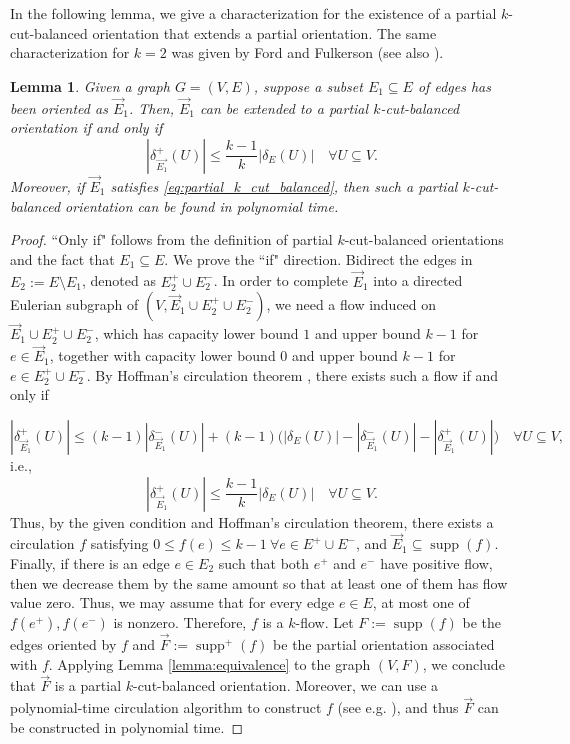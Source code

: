 \documentclass[11pt]{article}
\newtheorem{lemma}[theorem]{Lemma}
\DeclareMathOperator{\supp}{supp}
\begin{document}
In the following lemma, we give a characterization for the existence of a partial $k$-cut-balanced orientation that extends a partial orientation. The same characterization for $k=2$ was given by Ford and Fulkerson \cite{ford2015flows} (see also \cite{kappauf1979mixed}).
\begin{lemma}\label{lemma:complete_k-balanced}
     Given a graph $G=(V,E)$, suppose a subset $E_1\subseteq E$ of edges  has been oriented as $\vec{E}_1$. Then, $\vec{E}_1$ can be extended to a partial $k$-cut-balanced orientation if and only if 
\begin{equation}\label{eq:partial_k_cut_balanced}
         |\delta_{\vec{E_1}}^+(U)|\leq \frac{k-1}{k}|\delta_E(U)|\quad \forall U\subseteq V.
     \end{equation}
     Moreover, if $\vec{E}_1$ satisfies \eqref{eq:partial_k_cut_balanced}, then such a partial $k$-cut-balanced orientation can be found in polynomial time.
\end{lemma}
\begin{proof}
    ``Only if" follows from the definition of partial $k$-cut-balanced orientations and the fact that $E_1\subseteq E$. We prove the ``if" direction. Bidirect the edges in $E_2:=E\setminus E_1$, denoted as $E_2^+\cup E_2^-$. In order to complete $\vec{E}_1$ into a directed Eulerian subgraph of $(V,\vec{E}_1\cup E_2^+\cup E_2^-)$, we need a flow induced on $\vec{E}_1\cup E_2^+\cup E_2^-$, which has capacity lower bound $1$ and upper bound $k-1$ for $e\in \vec{E}_1$, together with capacity lower bound $0$ and upper bound $k-1$ for $e\in  E_2^+\cup E_2^-$. By Hoffman's circulation theorem \cite{hoffman2003some}, there exists such a flow if and only if 

\[
    |\delta_{\vec{E}_1}^+(U)|\leq (k-1)|\delta_{\vec{E}_1}^-(U)|+(k-1)\Big(|\delta_{E}(U)|-|\delta_{\vec{E}_1}^-(U)|-|\delta_{\vec{E}_1}^+(U)|\Big)\quad \forall U\subseteq V,
\]
i.e.,
\[
    |\delta_{\vec{E}_1}^+(U)|\leq \frac{k-1}{k} |\delta_{E}(U)|\quad \forall U\subseteq V.
\]
Thus, by the given condition and Hoffman's circulation theorem, there exists a circulation $f$ satisfying $0\leq f(e)\leq k-1\ \forall e\in E^+\cup E^-$, and $\vec{E}_1\subseteq\supp(f)$.
Finally, if there is an edge $e\in E_2$ such that both $e^+$ and $e^-$ have positive flow, then we decrease them by the same amount so that at least one of them has flow value zero. Thus, we may assume that for every edge $e\in E$, at most one of $f(e^+),f(e^-)$ is nonzero. Therefore, $f$ is a $k$-flow. Let $F:=\supp(f)$ be the edges oriented by $f$ and $\vec{F}:=\supp^+(f)$ be the partial orientation associated with $f$. Applying Lemma \ref{lemma:equivalence} to the graph $(V,F)$, we conclude that $\vec{F}$ is a partial $k$-cut-balanced orientation. Moreover, we can use a polynomial-time circulation algorithm to construct $f$ (see e.g. \cite{ford2015flows,chen2022maximum}), and thus $\vec{F}$ can be constructed in polynomial time.
\end{proof}
\end{document}
